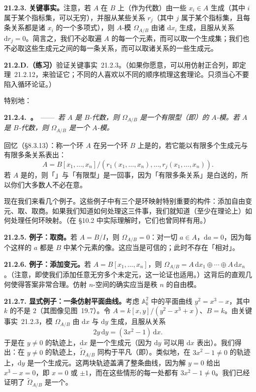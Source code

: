 \textbf{21.2.3. 关键事实。}\quad 注意，若 $A$ 在 $B$ 上（作为代数）由一些 $x_i\in A$ 生成（其中 $i$ 属于某个指标集，可以无穷），并服从某些关系 $r_j$（其中 $j$ 属于某个指标集，且每条关系都是诸 $x_i$ 的一个多项式），则 $A$-模 $\Omega_{A/B}$ 由诸 $\mathrm{d}x_i$ 生成，且服从关系 $\mathrm{d}r_j=0$。简言之，我们不必取遍 $A$ 的每一个元素，而可以取一个生成集；我们也不必取这些生成元之间的每一条关系，而可以取诸关系的一些生成元。

\textbf{21.2.D.（练习）}\quad 验证\mbox{关键事实~21.2.3}。（如果你愿意，可以用仿射\trConormal{}正合列，即\mbox{定理~21.2.12}，来验证它；不同的人喜欢以不同的顺序梳理这套理论。只须当心不要陷入循环论证。）

特别地：

\textbf{21.2.4.\ \trhProposition。}\ ——\ \emph{若 $A$ 是\trFinitelyGenerated{} $B$-代数，则 $\Omega_{A/B}$ 是一个有限型（即\trFinitelyGenerated{}）的 $A$-模。若 $A$ 是\trFinitelyPresented{} $B$-代数，则 $\Omega_{A/B}$ 是一个\trFinitelyPresented{} $A$-模。}

回忆（\S8.3.13）：称一个环 $A$ 在另一个环 $B$ 上是\emph{\trFinitelyPresented}的，若它能以有限多个生成元与有限多条关系表出：
\[
A=B[x_1,\dots,x_n]/(r_1(x_1,\dots,x_n),\dots,r_j(x_1,\dots,x_n)).
\]
若 $A$ 是\trNoetherian{}的，则「\trFinitelyPresented」与「有限型」是一回事，因为「有限多条关系」是白送的，所以你们大多数人不必在意。

现在我们来看几个例子。这些例子中有三个是环映射特别重要的构件：添加自由变元、取\trLocalization、取商。如果我们知道如何处理这三件事，我们就知道（至少在理论上）如何处理任何环映射。（在 \S10.2 中实际理解\trFiberProduct{}时，它们也曾同样有用。）

\textbf{21.2.5. 例子：取商。}\quad 若 $A=B/I$，则 $\Omega_{A/B}=0$：对一切 $a\in A$，$\mathrm{d}a=0$，因为每个这样的 $a$ 都是 $B$ 中某个元素的像。这应当是可信的；此时不存在「相对\trTangentVector」。

\textbf{21.2.6. 例子：添加变元。}\quad 若 $A=B[x_1,\dots,x_n]$，则 $\Omega_{A/B}=A\,\mathrm{d}x_1\oplus\cdots\oplus A\,\mathrm{d}x_n$。（注意，即使我们添加任意无穷多个未定元，这一论证也适用。）这背后的直观几何使得答案非常合理。仿射 $n$-空间的\trCotangentBundle{}确实应当是秩 $n$ 的自由模。

\textbf{21.2.7. 显式例子：一条仿射平面曲线。}\quad 考虑 $\mathbb{A}^2_k$ 中的平面曲线 $y^2=x^3-x$，其中 $k$ 的\trCharacteristic{}不是 $2$（其图像见图~19.7）。令 $A=k[x,y]/(y^2-x^3+x)$、$B=k$。由\mbox{关键事实~21.2.3}，\trDifferential{}模 $\Omega_{A/B}$ 由 $\mathrm{d}x$ 与 $\mathrm{d}y$ 生成，且服从关系
\[
2y\,\mathrm{d}y=(3x^2-1)\,\mathrm{d}x.
\]
于是在 $y\ne 0$ 的轨迹上，$\mathrm{d}x$ 是一个生成元（因为 $\mathrm{d}y$ 可以用 $\mathrm{d}x$ 表出）。我们得出：在 $y\ne 0$ 的轨迹上，$\widetilde{\Omega}_{A/B}$ 同构于平凡\trLineBundle{}（即\trInvertibleSheaf）。类似地，在 $3x^2-1\ne 0$ 的轨迹上，$\mathrm{d}y$ 是一个生成元。这两块轨迹盖满了整条曲线，因为解 $y=0$ 给出 $x^3-x=0$，即 $x=0$ 或 $\pm 1$，而在这些情形的每一处都有 $3x^2-1\ne 0$。我们已经证明了 $\widetilde{\Omega}_{A/B}$ 是一个\trInvertibleSheaf。

